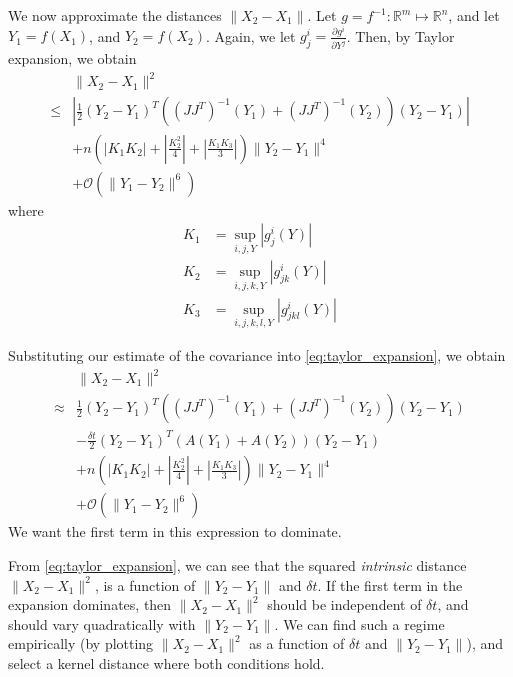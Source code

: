 \documentclass[1p]{elsarticle}
\begin{document}
We now approximate the distances $\| X_2 - X_1 \|$.
%
Let $g = f^{-1}: \mathbb{R}^m \mapsto \mathbb{R}^n$, and let $Y_1 = f(X_1)$, and $Y_2 = f(X_2)$.
%
Again, we let $g_j^i = \frac{\partial g^i}{\partial Y^j}$.
%
Then, by Taylor expansion, we obtain
\begin{equation} \label{eq:taylor_expansion}
\begin{aligned}
&\| X_2 - X_1 \|^2 \\
\le&  \left| \frac{1}{2} (Y_2 - Y_1 )^T ((J J^T)^{-1} (Y_1) + (J J^T)^{-1}(Y_2)) (Y_2 - Y_1 ) \right| \\
& + n \left( \left| K_1 K_2 \right| + \left| \frac{ K_2^2}{4} \right|  + \left| \frac{K_1 K_3}{3} \right|  \right) \| Y_2 - Y_1 \| ^4  \\
& + \mathcal{O} (\|Y_1 - Y_2 \|^6 ) 
\end{aligned}
\end{equation}
%
where
%
\begin{equation}
\begin{aligned}
K_1 &= \sup_{i,j,Y} |g_j^i(Y)|\\
K_2 &= \sup_{i,j,k,Y} |g_{jk}^i(Y)|\\
K_3 &= \sup_{i,j,k,l,Y} |g_{jkl}^i(Y)|
\end{aligned}
\end{equation}

Substituting our estimate of the covariance into \eqref{eq:taylor_expansion}, we obtain
\begin{equation}
\begin{aligned}
&\| X_2 - X_1 \|^2 \\
\approx &  \frac{1}{2} (Y_2 - Y_1)^T \left((J J^T)^{-1}(Y_1)  + (J J^T)^{-1}(Y_2) \right) (Y_2 - Y_1) \\
& - \frac{\delta t}{2} (Y_2 - Y_1)^T \left( A(Y_1) + A(Y_2) \right) (Y_2 - Y_1)\\
& + n \left( \left| K_1 K_2 \right| + \left| \frac{ K_2^2}{4} \right|  + \left| \frac{K_1 K_3}{3} \right|  \right) \| Y_2 - Y_1 \| ^4  \\
& + \mathcal{O} (\|Y_1 - Y_2 \|^6 ) 
\end{aligned}
\end{equation}
%
We want the first term in this expression to dominate.

From \eqref{eq:taylor_expansion}, we can see that the squared {\em intrinsic} distance $\| X_2 - X_1 \|^2$, is a function of $\|Y_2 - Y_1\|$ and $\delta t$. 
%
If the first term in the expansion dominates, then $\|X_2 - X_1 \|^2$ should be independent of $\delta t$, and should vary quadratically with $\| Y_2 - Y_1\|$. 
%
We can find such a regime empirically (by plotting $\| X_2 - X_1 \|^2$ as a function of $\delta t$ and $\|Y_2 - Y_1\|$), and select a kernel distance where both conditions hold.
\end{document}
